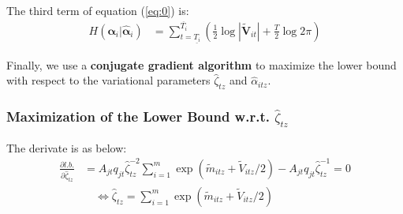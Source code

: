 \documentclass{article}
\begin{document}
The third term of equation (\ref{eq:0}) is:
\begin{align}
	\label{eq:3} H(\bm{\alpha}_i|\bm{\hat\alpha}_i) &= \sum_{t=\underline{T_i}}^{\overline{T_i}} \left(\frac{1}{2}\log|\widetilde{\bm V}_{it}| + \frac{T}{2}\log2\pi \right)
\end{align}

Finally, we use a \textbf{conjugate gradient algorithm} to maximize the lower bound with respect to the variational parameters $\hat\zeta_{tz}$ and $\hat\alpha_{itz}$.

\subsubsection*{Maximization of the Lower Bound w.r.t. $\hat\zeta_{tz}$}
The derivate is as below:
\begin{align}
	\frac{\partial l.b.}{\partial \hat\zeta_{tz}} &= A_{jt} q_{jt} \hat\zeta_{tz}^{-2}\sum_{i=1}^m\exp(\widetilde{m}_{itz}+\widetilde{V}_{itz}/2) - A_{jt} q_{jt} \hat\zeta_{tz}^{-1} = 0 \\
	&\quad\Leftrightarrow \hat\zeta_{tz} = \sum_{i=1}^m\exp(\widetilde{m}_{itz}+\widetilde{V}_{itz}/2)
\end{align}
\end{document}
